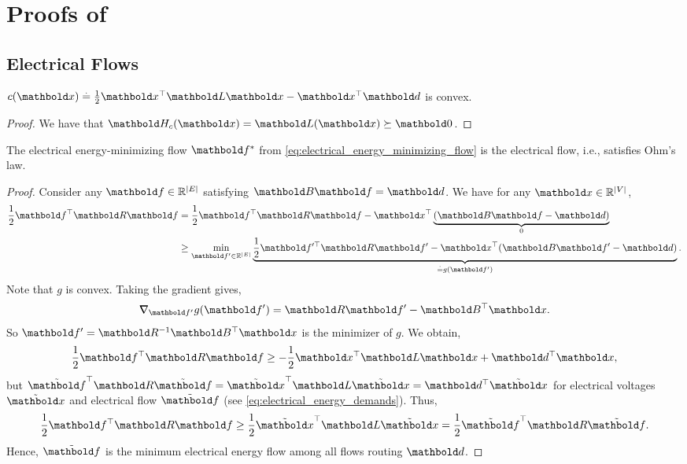 
\chapter{Proofs of }

\section{Electrical Flows}

\begin{lem}\label{lem:a1}
$c(\vx) \defeq \frac{1}{2}\trans{\vx}\mL\vx - \trans{\vx}\vd$ is convex.
\end{lem}
\begin{proof} We have that $\mH_c(\vx) = \mL(\vx) \succeq \mZero$.
\end{proof}

\begin{lem}\label{lem:a2}
The electrical energy-minimizing flow $\s{\vf}$ from \cref{eq:electrical_energy_minimizing_flow} is the electrical flow, i.e., satisfies Ohm's law.
\end{lem}
\begin{proof} Consider any $\vf \in \R^{|\sE|}$ satisfying $\mB\vf = \vd$. We have for any $\vx \in \R^{|\sV|}$, \begin{align*}
    \frac{1}{2}\trans{\vf}\mR\vf &= \frac{1}{2}\trans{\vf}\mR\vf - \trans{\vx}\underbrace{(\mB\vf - \vd)}_{0} \\
    &\geq \min_{\vf' \in \R^{|\sE|}} \underbrace{\frac{1}{2}\trans{\vf'}\mR\vf' - \trans{\vx}(\mB\vf' - \vd)}_{\eqdef g(\vf')}.
\end{align*} Note that $g$ is convex. Taking the gradient gives, \begin{align*}
    \grad_{\vf'} g(\vf') = \mR\vf' - \trans{\mB}\vx.
\end{align*} So $\vf' = \inv{\mR}\trans{\mB}\vx$ is the minimizer of $g$. We obtain, \begin{align*}
    \frac{1}{2}\trans{\vf}\mR\vf \geq -\frac{1}{2}\trans{\vx}\mL\vx + \trans{\vd}\vx,
\end{align*} but $\trans{\Tilde{\vf}}\mR\Tilde{\vf} = \trans{\Tilde{\vx}}\mL\Tilde{\vx} = \trans{\vd}\Tilde{\vx}$ for electrical voltages $\Tilde{\vx}$ and electrical flow $\Tilde{\vf}$ (see \cref{eq:electrical_energy_demands}). Thus, \begin{align*}
    \frac{1}{2}\trans{\vf}\mR\vf \geq \frac{1}{2}\trans{\Tilde{\vx}}\mL\Tilde{\vx} = \frac{1}{2}\trans{\Tilde{\vf}}\mR\Tilde{\vf}.
\end{align*} Hence, $\Tilde{\vf}$ is the minimum electrical energy flow among all flows routing $\vd$.
\end{proof}

